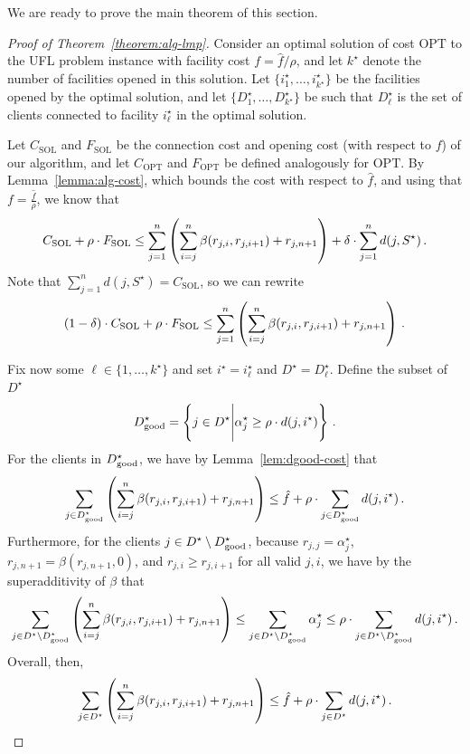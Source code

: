 We are ready to prove the main theorem of this section.

\begin{proof}[Proof of Theorem~\ref{theorem:alg-lmp}]
    Consider an optimal solution of cost $\mathrm{OPT}$ to the UFL problem instance with facility cost $f = \hat{f}/\rho$, and let $k^\star$ denote the number of facilities opened in this solution.
    Let $\{i_1^\star, \ldots, i_{k^\star}^\star\}$ be the facilities opened by the optimal solution, and let $\{D_1^\star, \ldots, D_{k^\star}^\star\}$ be such that $D_\ell^\star$ is the set of clients connected to facility $i_\ell^\star$ in the optimal solution.
    
    Let $C_{\mathrm{SOL}}$ and $F_{\mathrm{SOL}}$ be the connection cost and opening cost (with respect to $f$) of our algorithm, and let $C_{\mathrm{OPT}}$ and $F_{\mathrm{OPT}}$ be defined analogously for $\mathrm{OPT}$.
    By Lemma~\ref{lemma:alg-cost}, which bounds the cost with respect to $\hat{f}$, and using that $f = \frac{\hat{f}}{\rho}$, we know that 
    \[C_{\mathrm{SOL}} + \rho \cdot F_{\mathrm{SOL}} \leq \sum_{j=1}^n \left(\sum_{i=j}^{n} \beta(r_{j,i}, r_{j,i+1}) + r_{j,n+1}\right) + \delta \cdot \sum_{j=1}^n d(j,S^\star)\,.\]
    Note that $\sum_{j=1}^n d(j, S^\star) = C_{\mathrm{SOL}}$, so we can rewrite
    \[(1-\delta) \cdot C_{\mathrm{SOL}} + \rho \cdot F_{\mathrm{SOL}} \leq \sum_{j=1}^n \left(\sum_{i=j}^{n} \beta(r_{j,i}, r_{j,i+1}) + r_{j,n+1}\right)\,.\]

    Fix now some $\ell \in \{1, \ldots, k^\star\}$ and set $i^\star = i^\star_\ell$ and $D^\star = D^\star_{\ell}$.
    Define the subset of $D^\star$
    \[D^\star_{\mathrm{good}} = \left\{j \in D^\star \Bigg| \alpha_j^\star \geq \rho \cdot d(j, i^\star)\right\}\,.\]
    For the clients in $D^\star_{\mathrm{good}}$, we have by Lemma~\ref{lem:dgood-cost} that
    \[\sum_{j \in D^\star_{\mathrm{good}}} \left(\sum_{i=j}^n \beta(r_{j,i}, r_{j,i+1}) + r_{j,n+1}\right) \leq \hat{f} + \rho \cdot \sum_{j \in D^\star_{\mathrm{good}}} d(j, i^\star)\,.\]
    Furthermore, for the clients $j \in D^\star \setminus D^\star_{\mathrm{good}}$, because $r_{j,j} = \alpha_j^\star$, $r_{j,n+1} = \beta(r_{j,n+1}, 0)$, and $r_{j,i} \geq r_{j,i+1}$ for all valid $j,i$, we have by the superadditivity of $\beta$ that
    \[\sum_{j \in D^\star \setminus D^\star_{\mathrm{good}}} \left(\sum_{i=j}^n \beta(r_{j,i}, r_{j,i+1}) + r_{j,n+1}\right) \leq \sum_{j \in D^\star \setminus D^\star_{\mathrm{good}}} \alpha^\star_j \leq \rho \cdot \sum_{j \in D^\star \setminus D^\star_{\mathrm{good}}} d(j, i^\star)\,.\]
    Overall, then,
    \[\sum_{j \in D^\star} \left(\sum_{i=j}^n \beta(r_{j,i}, r_{j,i+1}) + r_{j,n+1}\right) \leq \hat{f} + \rho \cdot \sum_{j \in D^\star} d(j, i^\star)\,.\]
    

\end{proof}
